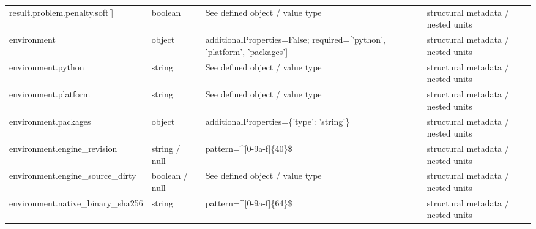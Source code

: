 \begin{longtable}{@{}>{\raggedright\arraybackslash}p{}>{\raggedright\arraybackslash}p{}>{\raggedright\arraybackslash}p{}>{\raggedright\arraybackslash}p{}@{}}
result.\allowbreak{}problem.\allowbreak{}penalty.\allowbreak{}soft[] & boolean & See defined object /\allowbreak{} value type & structural metadata /\allowbreak{} nested units\\
environment & object & additionalProperties=\allowbreak{}False; required=\allowbreak{}['python', 'platform', 'packages'] & structural metadata /\allowbreak{} nested units\\
environment.\allowbreak{}python & string & See defined object /\allowbreak{} value type & structural metadata /\allowbreak{} nested units\\
environment.\allowbreak{}platform & string & See defined object /\allowbreak{} value type & structural metadata /\allowbreak{} nested units\\
environment.\allowbreak{}packages & object & additionalProperties=\allowbreak{}\{'type': 'string'\} & structural metadata /\allowbreak{} nested units\\
environment.\allowbreak{}engine\_\allowbreak{}revision & string /\allowbreak{} null & pattern=\allowbreak{}\textasciicircum{}[0-9a-\allowbreak{}f]\{40\}\$ & structural metadata /\allowbreak{} nested units\\
environment.\allowbreak{}engine\_\allowbreak{}source\_\allowbreak{}dirty & boolean /\allowbreak{} null & See defined object /\allowbreak{} value type & structural metadata /\allowbreak{} nested units\\
environment.\allowbreak{}native\_\allowbreak{}binary\_\allowbreak{}sha256 & string & pattern=\allowbreak{}\textasciicircum{}[0-9a-\allowbreak{}f]\{64\}\$ & structural metadata /\allowbreak{} nested units\\
\end{longtable}\endgroup
